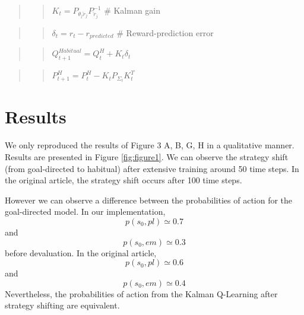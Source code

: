 \documentclass[10pt,a4paper,onecolumn]{article}
\begin{document}
\begin{quote}
\begin{quote}
\(K_t = P_{\theta_j \check{r}_j} P_{\check{r}_j}^{-1}\) \(\#\) Kalman
gain
\end{quote}
\end{quote}

\begin{quote}
\begin{quote}
\(\delta_t = r_t - r_{predicted}\) \(\#\) Reward-prediction error
\end{quote}
\end{quote}

\begin{quote}
\begin{quote}
\(Q_{t+1}^{Habitual} = Q_{t}^{H} + K_t \delta_t\)
\end{quote}
\end{quote}

\begin{quote}
\begin{quote}
\(P_{t+1}^{H} = P_{t}^{H} - K_t P_{\Sigma_t} K_t^T\)
\end{quote}
\end{quote}

\section{Results}\label{results}

We only reproduced the results of Figure 3 A, B, G, H in a qualitative
manner. Results are presented in Figure \ref{fig:figure1}. We can
observe the strategy shift (from goal-directed to habitual) after
extensive training around 50 time steps. In the original article, the
strategy shift occurs after 100 time steps.

However we can observe a difference between the probabilities of action
for the goal-directed model. In our implementation,
\[p(s_0, pl) \simeq 0.7\] and \[p(s_0, em) \simeq 0.3\] before
devaluation. In the original article, \[p(s_0, pl) \simeq 0.6\] and
\[p(s_0, em) \simeq 0.4\] Nevertheless, the probabilities of action from
the Kalman Q-Learning after strategy shifting are equivalent.
\end{document}

